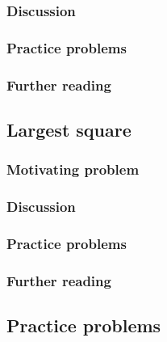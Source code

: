 
\subsubsection*{Discussion}

\subsubsection*{Practice problems}

\subsubsection*{Further reading}

\subsection{Largest square}

\subsubsection*{Motivating problem}







\subsubsection*{Discussion}

\subsubsection*{Practice problems}

\subsubsection*{Further reading}

\subsection{Practice problems}
